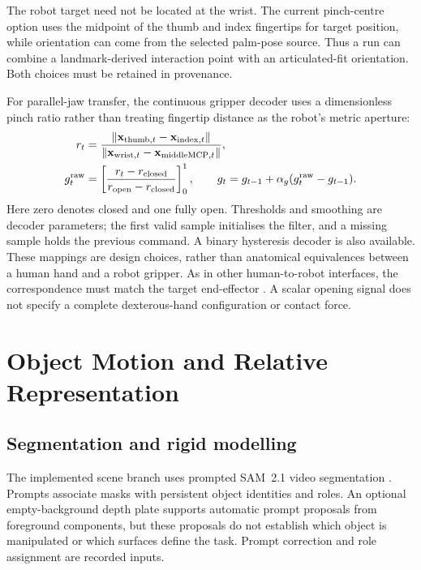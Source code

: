 The robot target need not be located at the wrist. The current pinch-centre
option uses the midpoint of the thumb and index fingertips for target
position, while orientation can come from the selected palm-pose source.
Thus a run can combine a landmark-derived interaction point with an
articulated-fit orientation. Both choices must be retained in provenance.

For parallel-jaw transfer, the continuous gripper decoder uses a
dimensionless pinch ratio rather than treating fingertip distance as the
robot's metric aperture:
\begin{align}
  r_t &=\frac{\lVert\mathbf{x}_{\mathrm{thumb},t}-\mathbf{x}_{\mathrm{index},t}\rVert}
                  {\lVert\mathbf{x}_{\mathrm{wrist},t}-\mathbf{x}_{\mathrm{middleMCP},t}\rVert},
       \nonumber\\
  g_t^{\mathrm{raw}}&=
       \left[\frac{r_t-r_{\mathrm{closed}}}
                    {r_{\mathrm{open}}-r_{\mathrm{closed}}}\right]_0^1,
  \qquad
  g_t=g_{t-1}+\alpha_g(g_t^{\mathrm{raw}}-g_{t-1}).
  \label{eq:gripper}
\end{align}
Here zero denotes closed and one fully open. Thresholds and smoothing are
decoder parameters; the first valid sample initialises the filter, and a
missing sample holds the previous command. A binary hysteresis decoder is
also available. These mappings are design choices, rather than anatomical
equivalences between a human hand and a robot gripper. As in other
human-to-robot interfaces, the correspondence must match the target
end-effector \cite{opentv,ace}. A scalar opening signal does not specify a
complete dexterous-hand configuration or contact force.

\section{Object Motion and Relative Representation}
\label{sec:objcentric}

\subsection{Segmentation and rigid modelling}

The implemented scene branch uses prompted SAM~2.1 video segmentation
\cite{sam2}. Prompts associate masks with persistent object identities and
roles. An optional empty-background depth plate supports automatic prompt
proposals from foreground components, but these proposals do not establish
which object is manipulated or which surfaces define the task. Prompt
correction and role assignment are recorded inputs.


